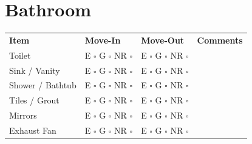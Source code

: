 
\section*{Bathroom}
\label{sec:bathroom}

\begin{longtable}{p{6cm} p{3cm} p{3cm} p{4cm}}
\textbf{Item} & \textbf{Move-In} & \textbf{Move-Out} & \textbf{Comments} \\
Toilet & E $\square$ G $\square$ NR $\square$ & E $\square$ G $\square$ NR $\square$ & \\
Sink / Vanity & E $\square$ G $\square$ NR $\square$ & E $\square$ G $\square$ NR $\square$ & \\
Shower / Bathtub & E $\square$ G $\square$ NR $\square$ & E $\square$ G $\square$ NR $\square$ & \\
Tiles / Grout & E $\square$ G $\square$ NR $\square$ & E $\square$ G $\square$ NR $\square$ & \\
Mirrors & E $\square$ G $\square$ NR $\square$ & E $\square$ G $\square$ NR $\square$ & \\
Exhaust Fan & E $\square$ G $\square$ NR $\square$ & E $\square$ G $\square$ NR $\square$ & \\
\end{longtable}

